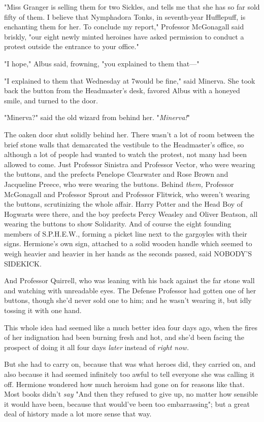 "Miss Granger is selling them for two Sickles, and tells me that she has so far
sold fifty of them. I believe that Nymphadora Tonks, in seventh-year
Hufflepuff, is enchanting them for her. To conclude my report," Professor
McGonagall said briskly, "our eight newly minted heroines have asked permission
to conduct a protest outside the entrance to your office."

"I hope," Albus said, frowning, "you explained to them that---"

"I explained to them that Wednesday at 7\PM would be fine," said Minerva. She
took back the button from the Headmaster's desk, favored Albus with a honeyed
smile, and turned to the door.

"Minerva?" said the old wizard from behind her. "\emph{Minerva!}"

The oaken door shut solidly behind her.
\sbreak
There wasn't a lot of room between the brief stone walls that demarcated the
vestibule to the Headmaster's office, so although a lot of people had wanted to
watch the protest, not many had been allowed to come. Just Professor Sinistra
and Professor Vector, who were wearing the buttons, and the prefects Penelope
Clearwater and Rose Brown and Jacqueline Preece, who were wearing the buttons.
Behind \emph{them,} Professor McGonagall and Professor Sprout and Professor
Flitwick, who weren't wearing the buttons, scrutinizing the whole affair. Harry
Potter and the Head Boy of Hogwarts were there, and the boy prefects Percy
Weasley and Oliver Beatson, all wearing the buttons to show Solidarity. And of
course the eight founding members of S.P.H.E.W., forming a picket line next to
the gargoyles with their signs. Hermione's own sign, attached to a solid wooden
handle which seemed to weigh heavier and heavier in her hands as the seconds
passed, said NOBODY'S SIDEKICK.

And Professor Quirrell, who was leaning with his back against the far stone
wall and watching with unreadable eyes. The Defense Professor had gotten one of
her buttons, though she'd never sold one to him; and he wasn't wearing it, but
idly tossing it with one hand.

This whole idea had seemed like a much better idea four days ago, when the
fires of her indignation had been burning fresh and hot, and she'd been facing
the prospect of doing it all four days \emph{later} instead of \emph{right now.}

But she had to carry on, because that was what heroes did, they carried on, and
also because it had seemed infinitely too awful to tell everyone she was
calling it off. Hermione wondered how much heroism had gone on for reasons like
that. Most books didn't \emph{say} "And then they refused to give up, no matter
how sensible it would have been, because that would've been too embarrassing";
but a great deal of history made a lot more sense that way.

